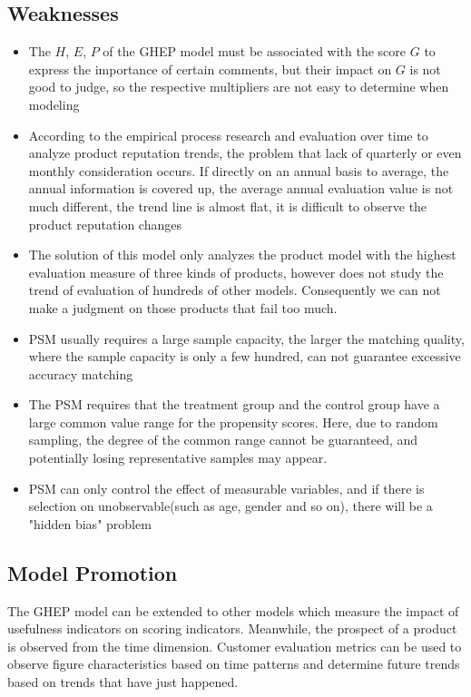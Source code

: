 \documentclass{mcmthesis}
\begin{document}
\subsection{Weaknesses}
\begin{itemize}
\item 
The $ H $, $ E $, $ P $ of the GHEP model must be associated with the score $ G $ to express the importance of certain comments, but their impact on $ G $ is not good to judge, so the respective multipliers are not easy to determine when modeling
\item 
According to the empirical process research and evaluation over time to analyze product reputation trends, the problem that lack of quarterly or even monthly consideration occurs. If directly on an annual basis to average, the annual information is covered up, the average annual evaluation value is not much different, the trend line is almost flat, it is difficult to observe the product reputation changes
\item 
The solution of this model only analyzes the product model with the highest evaluation measure of three kinds of products, however does not study the trend of evaluation of hundreds of other models. Consequently we can not make a judgment on those products that fail too much.
\item 
PSM usually requires a large sample capacity, the larger the matching quality, where the sample capacity is only a few hundred, can not guarantee excessive accuracy matching
\item 
The PSM requires that the treatment group and the control group have a large common value range for the propensity scores. Here, due to random sampling, the degree of the common range cannot be guaranteed, and potentially losing representative samples may appear.
\item
PSM can only control the effect of measurable variables, and if there is selection on unobservable(such as age, gender and so on), there will be a "hidden bias" problem

\end{itemize}
\subsection{Model Promotion}
The GHEP model can be extended to other models which measure the impact of usefulness indicators on scoring indicators. Meanwhile, the prospect of a product is observed from the time dimension. Customer evaluation metrics can be used to observe figure characteristics based on time patterns and determine future trends based on trends that have just happened.
\end{document}
